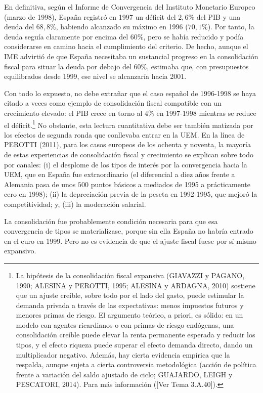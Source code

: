 \documentclass[10pt,a4paper]{article}
\newcommand{\authorfont}[1]{{\fontfamily{EBGaramond-TLF}\selectfont #1}}
\begin{document}
En definitiva, según el Informe de Convergencia del Instituto Monetario Europeo (marzo de 1998), España registró en 1997 un déficit del $2,6\%$ del PIB y una deuda del $68,8\%$, habiendo alcanzado su máximo en 1996 ($70,1\%$). Por tanto, la deuda seguía claramente por encima del $60\%$, pero se había reducido y podía considerarse en camino hacia el cumplimiento del criterio. De hecho, aunque el IME advirtió de que España necesitaba un sustancial progreso en la consolidación fiscal para situar la deuda por debajo del $60\%$, estimaba que, con presupuestos equilibrados desde 1999, ese nivel se alcanzaría hacia 2001.

Con todo lo expuesto, no debe extrañar que el caso español de 1996-1998 se haya citado a veces como ejemplo de consolidación fiscal compatible con un crecimiento elevado: el PIB crece en torno al $4\%$ en 1997-1998 mientras se reduce el déficit.\footnote{La hipótesis de la consolidación fiscal expansiva (GIAVAZZI y PAGANO, 1990; ALESINA y PEROTTI, 1995; ALESINA y ARDAGNA, 2010) sostiene que un ajuste creíble, sobre todo por el lado del gasto, puede estimular la demanda privada a través de las expectativas: menos impuestos futuros y menores primas de riesgo. El argumento teórico, a priori, es sólido: en un modelo con agentes ricardianos o con primas de riesgo endógenas, una consolidación creíble puede elevar la renta permanente esperada y reducir los tipos, y el efecto riqueza puede superar el efecto demanda directo, dando un multiplicador negativo. Además, hay cierta evidencia empírica que la respalda, aunque sujeta a cierta controversia metodológica (acción de política frente a variación del saldo ajustado de ciclo; GUAJARDO, LEIGH y PESCATORI, 2014). Para más información ([\authorfont{Ver Tema 3.A.40}]).
} No obstante, esta lectura cuantitativa debe ser también matizada por los efectos de segunda ronda que conllevaba entrar en la UEM. En la línea de PEROTTI (2011), para los casos europeos de los ochenta y noventa, la mayoría de estas experiencias de consolidación fiscal y crecimiento se explican sobre todo por canales: (i) el desplome de los tipos de interés por la convergencia hacia la UEM, que en España fue extraordinario (el diferencial a diez años frente a Alemania pasa de unos $500$ puntos básicos a mediados de 1995 a prácticamente cero en 1998); (ii) la depreciación previa de la peseta en 1992-1995, que mejoró la competitividad; y, (iii) la moderación salarial.

La consolidación fue probablemente condición necesaria para que esa convergencia de tipos se materializase, porque sin ella España no habría entrado en el euro en 1999. Pero no es evidencia de que el ajuste fiscal fuese por sí mismo expansivo. 
\end{document}
